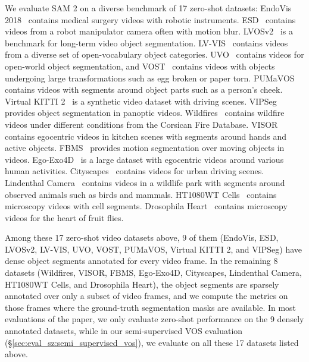 \documentclass[]{fairmeta}
\newcommand{\secref}[1]{\S\ref{#1}}
\begin{document}
We evaluate SAM 2 on a diverse benchmark of 17 zero-shot datasets: EndoVis 2018~\citep{allan20202018} contains medical surgery videos with robotic instruments. ESD~\citep{huang2023neuromorphic} contains videos from a robot manipulator camera often with motion blur. LVOSv2~\citep{hong2024lvos} is a benchmark for long-term video object segmentation. LV-VIS~\citep{wang2023towards} contains videos from a diverse set of open-vocabulary object categories. UVO~\citep{wang2021unidentified} contains videos for open-world object segmentation, and VOST~\citep{Tokmakov2022BreakingT} contains videos with objects undergoing large transformations such as egg broken or paper torn. PUMaVOS~\citep{bekuzarov2023xmem++} contains videos with segments around object parts such as a person's cheek. Virtual KITTI 2~\citep{cabon2020virtual} is a synthetic video dataset with driving scenes. VIPSeg~\citep{miao2022large} provides object segmentation in panoptic videos. Wildfires~\citep{toulouse2017computer} contains wildfire videos under different conditions from the Corsican Fire Database. VISOR~\citep{darkhalil2022epic} contains egocentric videos in kitchen scenes with segments around hands and active objects. FBMS~\citep{brox2010freiburg} provides motion segmentation over moving objects in videos. Ego-Exo4D~\citep{grauman2023ego} is a large dataset with egocentric videos around various human activities. Cityscapes~\citep{cordts2016cityscapes} contains videos for urban driving scenes. Lindenthal Camera~\citep{haucke2021exploiting} contains videos in a wildlife park with segments around observed animals such as birds and mammals. HT1080WT Cells~\citep{gomez2021search} contains microscopy videos with cell segments. Drosophila Heart~\citep{fishman2023drosophila} contains microscopy videos for the heart of fruit flies.

Among these 17 zero-shot video datasets above, 9 of them (EndoVis, ESD, LVOSv2, LV-VIS, UVO, VOST, PUMaVOS, Virtual KITTI 2, and VIPSeg) have dense object segments annotated for every video frame. In the remaining 8 datasets (Wildfires, VISOR, FBMS, Ego-Exo4D, Cityscapes, Lindenthal Camera, HT1080WT Cells, and Drosophila Heart), the object segments are sparsely annotated over only a subset of video frames, and we compute the metrics on those frames where the ground-truth segmentation masks are available. In most evaluations of the paper, we only evaluate zero-shot performance on the 9 densely annotated datasets, while in our semi-supervised VOS evaluation (\secref{sec:eval_sz:semi_supervised_vos}), we evaluate on all these 17 datasets listed above.
\end{document}
